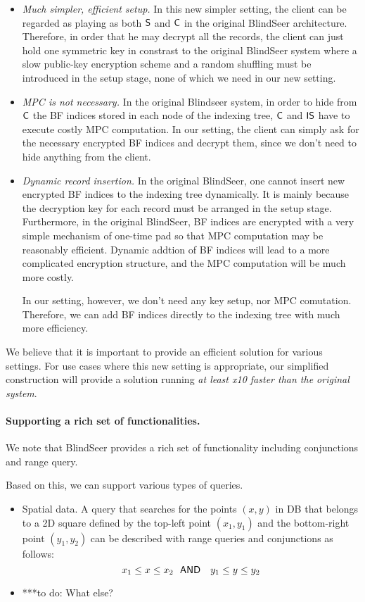 \begin{itemize}
\item {\em Much simpler, efficient setup.}
In this new simpler setting, the client can be regarded as playing as both $\sf
 S$ and $\sf C$ in the original BlindSeer architecture. Therefore, in order
 that he may decrypt all the records, the client can just hold one symmetric
 key in constrast to the original BlindSeer system where a slow public-key
 encryption scheme and a random shuffling must be introduced in the setup
 stage, none of which we need in our new setting. 

\item {\em MPC is not necessary.} In the original Blindseer system, in order to
hide from $\sf C$ the BF indices stored in each node of the indexing tree, $\sf
C$ and $\sf IS$ have to execute costly MPC computation. In our setting, the
client can simply ask for the necessary encrypted BF indices and decrypt
them, since we don't need to hide anything from the client.  


\item {\em Dynamic record insertion.} In the original BlindSeer, one cannot
insert new encrypted BF indices to the indexing tree dynamically.  It is mainly
because the decryption key for each record must be arranged in the setup
stage.
%
Furthermore, in the original BlindSeer, BF indices are encrypted with a very
    simple mechanism of one-time pad so that MPC computation may be reasonably
    efficient. Dynamic addtion of BF indices will lead to a more complicated
    encryption structure, and the MPC computation will be much more costly.

In our setting, however, we don't need any key setup, nor MPC comutation.
Therefore, we can add BF indices directly to the indexing tree with much more
efficiency.  
\end{itemize}

We believe that it is important to provide an efficient solution for various
settings. For use cases where this new setting is appropriate, our simplified
construction will provide a solution running {\em at least x10 faster than the
original system}.  

\paragraph{Supporting a rich set of functionalities.}
We note that BlindSeer provides a rich set of functionality including
conjunctions and range query. 

Based on this, we can support various types of queries. 
\begin{itemize}
\item Spatial data. A query that searches for the points $(x, y)$ in DB that
belongs to a 2D square defined by the top-left point $(x_1, y_1)$ and the
bottom-right point $(y_1, y_2)$ can be described with range queries and conjunctions as follows:
  $$ x_1 \le x \le x_2 ~~{\sf AND}~~~ y_1 \le y \le y_2 $$

\item ***to do: What else? 
\end{itemize}

